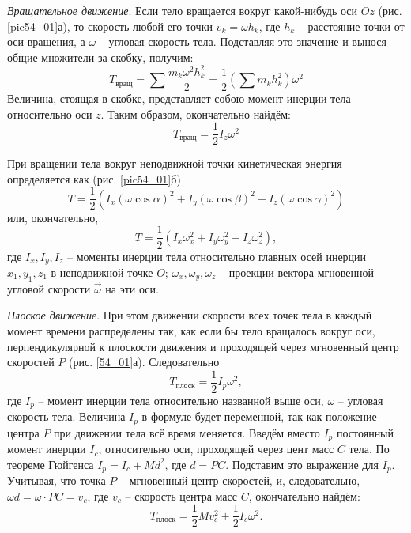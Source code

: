 \emph{Вращательное движение}. Если тело вращается вокруг какой-нибудь 
оси \( Oz \) (рис. \ref{pic54_01}а), то скорость любой его точки 
\( v_k = \omega h_k \), где \( h_k \) -- расстояние точки от оси вращения, 
а \( \omega \) -- угловая скорость тела. Подставляя это значение и вынося 
общие множители за скобку, получим:
\[ 
	T_{\text{вращ}} = \sum\frac{m_k \omega^2 h^2_k}{2} = 
	\frac{1}{2}\left( \sum m_k h^2_k \right)\omega^2
\]
Величина, стоящая в скобке, представляет собою момент инерции тела 
относительно оси \( z \). Таким образом, окончательно найдём:
\[ T_{\text{вращ}} = \frac{1}{2}I_z \omega^2 \]

При вращении тела вокруг неподвижной точки кинетическая энергия 
определяется как (рис. \ref{pic54_01}б)
\[ 
	T = \frac{1}{2}\left( I_x(\omega\cos\alpha)^2 + 
	I_y(\omega\cos\beta)^2 + I_z(\omega\cos\gamma)^2 \right)
\]
или, окончательно, 
\[ 
	T = \frac{1}{2}\left( I_x\omega^2_x + I_y\omega^2_y + I_z\omega^2_z \right), 
\]
где \( I_x, I_y, I_z \) -- моменты инерции тела относительно главных 
осей инерции \( x_1, y_1, z_1 \) в неподвижной точке \( O \); 
\( \omega_x, \omega_y, \omega_z \) -- проекции вектора мгновенной 
угловой скорости \( \vec{\omega} \) на эти оси.

\emph{Плоское движение}. При этом движении скорости всех точек тела в 
каждый момент времени распределены так, как если бы тело вращалось 
вокруг оси, перпендикулярной к плоскости движения и проходящей через 
мгновенный центр скоростей \( P \) (рис. \ref{54_01}а). Следовательно 
\[
	T_\text{плоск} = \frac{1}{2}I_p \omega^2,
\]
где \( I_p \) -- момент инерции тела относительно названной выше оси, 
\( \omega \) -- угловая скорость тела. Величина \( I_p \) в формуле 
будет переменной, так как положение центра \( P \) при движении тела 
всё время меняется. Введём вместо \( I_p \) постоянный момент инерции 
\( I_c \), относительно оси, проходящей через цент масс \( C \) 
тела. По теореме Гюйгенса \( I_p = I_c + Md^2 \), где \( d = PC \). 
Подставим это выражение для \( I_p \). Учитывая, что точка \( P \) -- 
мгновенный центр скоростей, и, следовательно, 
\( \omega d = \omega\cdot PC = v_c \), где \( v_c \) -- скорость 
центра масс \( C \), окончательно найдём:
\[ 
	T_\text{плоск} = \frac{1}{2}Mv^2_c + 
	\frac{1}{2}I_c \omega^2.
\]

\newpage
